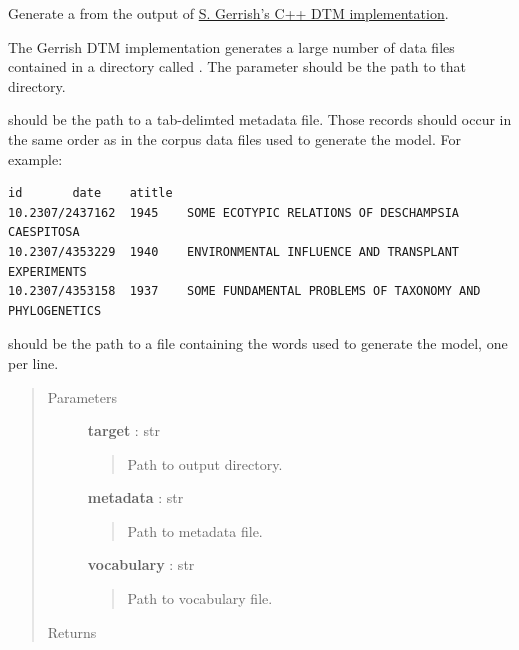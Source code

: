 \documentclass[letterpaper,10pt,english]{sphinxmanual}
\begin{document}
\begin{fulllineitems}
\label{tethne.model.corpus.dtmmodel:tethne.model.corpus.dtmmodel.from_gerrish}
Generate a {\hyperref[tethne.model.corpus.dtmmodel:tethne.model.corpus.dtmmodel.DTMModel]{}} from the output of \href{http://code.google.com/p/princeton-statistical-learning/downloads/detail?name=dtm\_release-0.8.tgz}{S. Gerrish's C++ DTM 
implementation}.

The Gerrish DTM implementation generates a large number of data files
contained in a directory called . The  parameter
should be the path to that directory.

 should be the path to a tab-delimted metadata file. Those
records should occur in the same order as in the corpus data files used
to generate the model. For example:

\begin{Verbatim}[commandchars=\\\{\}]
id       date    atitle
10.2307/2437162  1945    SOME ECOTYPIC RELATIONS OF DESCHAMPSIA CAESPITOSA
10.2307/4353229  1940    ENVIRONMENTAL INFLUENCE AND TRANSPLANT EXPERIMENTS
10.2307/4353158  1937    SOME FUNDAMENTAL PROBLEMS OF TAXONOMY AND PHYLOGENETICS
\end{Verbatim}

 should be the path to a file containing the words used to
generate the model, one per line.
\begin{quote}\begin{description}
\item[{Parameters}] \leavevmode
\textbf{target} : str
\begin{quote}

Path to  output directory.
\end{quote}

\textbf{metadata} : str
\begin{quote}

Path to metadata file.
\end{quote}

\textbf{vocabulary} : str
\begin{quote}

Path to vocabulary file.
\end{quote}

\item[{Returns}] \leavevmode
{\hyperref[tethne.model.corpus.dtmmodel:tethne.model.corpus.dtmmodel.DTMModel]{}}

\end{description}\end{quote}

\end{fulllineitems}
\end{document}
